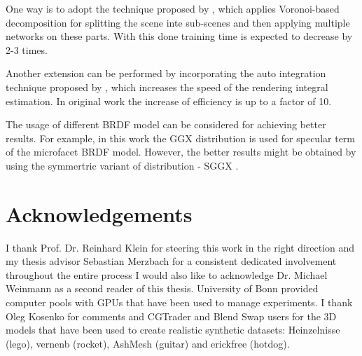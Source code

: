 One way is to adopt the technique proposed by \cite{rebain2020derf},
which applies Voronoi-based decomposition for splitting the scene inte sub-scenes
and then applying multiple networks on these parts.
With this done training time is expected to decrease by 2-3 times.

Another extension can be performed by incorporating the auto integration technique proposed by \cite{lindell2021autoint},
which increases the speed of the rendering integral estimation.
In original work the increase of efficiency is up to a factor of 10.

The usage of different BRDF model can be considered for achieving better results.
For example, in this work the GGX distribution \cite{walter2007microfacet}
is used for specular term of the microfacet BRDF model.
However, the better results might be obtained by using the symmertric variant of distribution - SGGX \cite{heitz2015sggx}.




\section{Acknowledgements}


I thank Prof. Dr. Reinhard Klein for steering this work in the right direction and my thesis advisor Sebastian Merzbach for a consistent dedicated involvement throughout the entire process
I would also like to acknowledge Dr. Michael Weinmann as a second reader of this thesis.
University of Bonn provided computer pools with GPUs that have been used to manage experiments.
I thank Oleg Kosenko for comments
and CGTrader and Blend Swap users for the 3D models
that have been used to create realistic synthetic datasets:
Heinzelnisse (lego), vernenb (rocket), AshMesh (guitar) and erickfree (hotdog).

